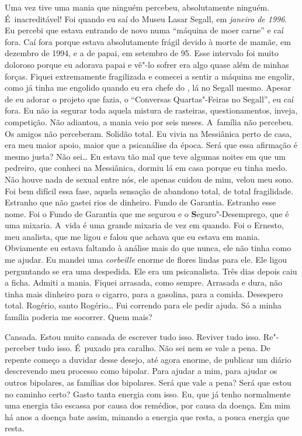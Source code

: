 Uma vez tive uma mania que ninguém percebeu, absolutamente ninguém.
É~inacreditável! Foi quando eu saí do Museu Lasar Segall, em
\emph{janeiro de 1996}. Eu percebi que estava entrando de novo numa
``máquina de moer carne'' e caí fora. Caí fora porque estava
absolutamente frágil devido à morte de mamãe, em dezembro de 1994, e a
de papai, em setembro de 95. Esse intervalo foi muito doloroso porque eu
adorava papai e vê"-lo sofrer era algo quase além de minhas forças.
Fiquei extremamente fragilizada e comecei a sentir a máquina me engolir,
como já tinha me engolido quando eu era chefe do , lá no Segall
mesmo. Apesar de eu adorar o projeto que fazia, o ``Conversas
Quartas"-Feiras no Segall'', eu caí fora. Eu não ia segurar toda aquela
mistura de rasteiras, questionamentos, inveja, competição. Não
adiantou, a mania veio por seis meses. A~família não percebeu. Os amigos
não perceberam. Solidão total. Eu vivia na Messiânica perto de casa, era
meu maior apoio, maior que a psicanálise da época. Será que essa
afirmação é mesmo justa? Não sei… Eu estava tão mal que teve
algumas noites em que um pedreiro, que conheci na Messiânica, dormiu lá
em casa porque eu tinha medo. Não houve nada de sexual entre nós, ele
apenas cuidou de mim, velou meu sono. Foi bem difícil essa fase, aquela
sensação de abandono total, de total fragilidade. Estranho que não
gastei rios de dinheiro. Fundo de Garantia. Estranho esse nome. Foi o
Fundo de Garantia que me segurou e o \textbf{S}eguro"-Desemprego, que é
uma mixaria. A~vida é uma grande mixaria de vez em quando. Foi o
Ernesto, meu analista, que me ligou e falou que achava que eu estava em
mania. Obviamente eu estava faltando à análise mais do que nunca, ele
não tinha como me ajudar. Eu mandei uma \emph{corbeille} enorme de
flores lindas para ele. Ele ligou perguntando se era uma despedida. Ele
era um psicanalista. Três dias depois caiu a ficha. Admiti a mania.
Fiquei arrasada, como sempre. Arrasada e dura, não tinha mais dinheiro
para o cigarro, para a gasolina, para a comida. Desespero total. Rogério, santo
Rogério… Fui correndo para ele pedir ajuda. Só a minha família
poderia me socorrer. Quem mais?

Cansada. Estou muito cansada de escrever tudo isso. Reviver tudo isso.
Re"-perceber tudo isso. É~puxado pra caralho. Não sei nem se vale a pena.
De repente começo a duvidar desse desejo, até agora enorme, de publicar
um diário descrevendo meu processo como bipolar. Para ajudar a mim, para
ajudar os outros bipolares, as famílias dos bipolares. Será que vale a
pena? Será que estou no caminho certo? Gasto tanta energia com isso. Eu,
que já tenho normalmente uma energia tão escassa por causa dos remédios,
por causa da doença. Em mim há anos a doença bate assim, minando a
energia que resta, a pouca energia que resta.

